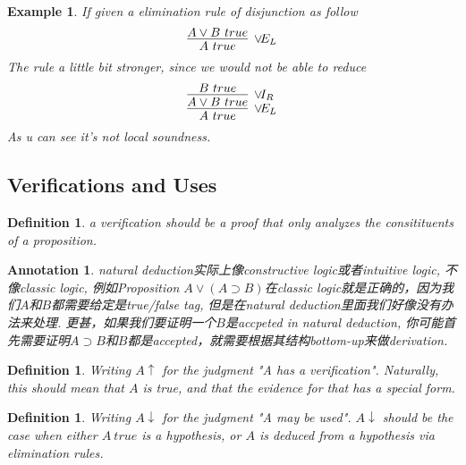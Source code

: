 \documentclass{article}
\theoremstyle{plain}
\newtheorem{example}[theorem]{Example}
\newtheorem{definition}[theorem]{Definition}
\newtheorem{annotation}[theorem]{Annotation}
\theoremstyle{nonumberplain}
\newcommand{\redt}[1]{\textcolor{red}{#1}}
\begin{document}
\begin{example}
\rm If given a elimination rule of disjunction as follow
$$
\infer[\vee\!E_L]{A~true}{A \vee B~true}
$$
The rule a little bit stronger, since we would not be able to reduce
$$
\infer[\vee\!E_L]{A~true}{\infer[\vee\!I_R]{A \vee B~true}{B~true}}
$$
As u can see it's not local soundness. 
\end{example}







\newpage
\subsection{Verifications and Uses}

\begin{definition}
\rm a verification should be a proof that only analyzes the consitituents of a proposition.
\end{definition}

\begin{annotation}
\rm natural deduction实际上像constructive logic或者intuitive logic,  不像classic logic, 例如Proposition $A \vee (A \supset B)$在classic logic就是正确的，因为我们$A$和$B$都需要给定是true/false tag, 但是在natural deduction里面我们好像没有办法来处理. 更甚，如果我们要证明一个$B$是accpeted in natural deduction, 你可能首先需要证明$A \supset B$和$B$都是accepted，就需要根据其结构bottom-up来做derivation. 
\end{annotation}


\begin{definition}
\rm Writing $A\uparrow$ for the judgment "A has a verification". Naturally, this should mean that $A$ is true,  and that the evidence for that has a special form.
\end{definition}

\begin{definition}
\rm Writing $A\downarrow$ for the judgment "A may be used". $A\downarrow$ should be the case when either $A~true$ is a hypothesis, or $A$ is deduced from a hypothesis via elimination rules. 
\end{definition}
\end{document}
